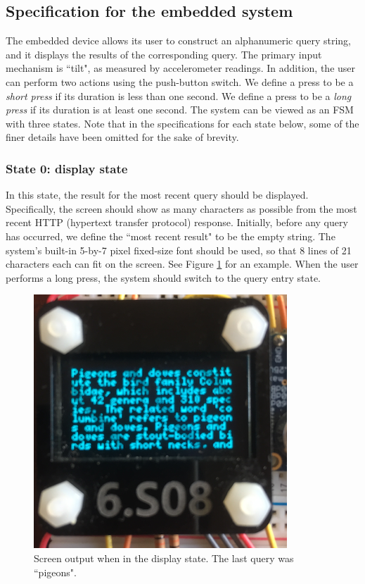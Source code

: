 \documentclass[12pt]{article}
\begin{document}
\subsection{Specification for the embedded system}
The embedded device allows its user to construct an alphanumeric query string, and it displays the results of the corresponding query.  The primary input mechanism is ``tilt", as measured by accelerometer readings.  In addition, the user can perform two actions using the push-button switch.  We define a press to be a \textit{short press} if its duration is less than one second.  We define a press to be a \textit{long press} if its duration is at least one second.  The system can be viewed as an FSM with three states.  Note that in the specifications for each state below, some of the finer details have been omitted for the sake of brevity.

\subsubsection{State 0: display state}
In this state, the result for the most recent query should be displayed.  Specifically, the screen should show as many characters as possible from the most recent HTTP (hypertext transfer protocol) response.  Initially, before any query has occurred, we define the ``most recent result" to be the empty string.  The system's built-in 5-by-7 pixel fixed-size font should be used, so that 8 lines of 21 characters each can fit on the screen.  See Figure \ref{fig:pigeons} for an example.  When the user performs a long press, the system should switch to the query entry state.

\begin{figure}[ht]
\centering
\includegraphics[width=0.5\linewidth]{text-wiki-close.png}
\caption{Screen output when in the display state. The last query was ``pigeons".}
\label{fig:pigeons}
\end{figure}
\end{document}
